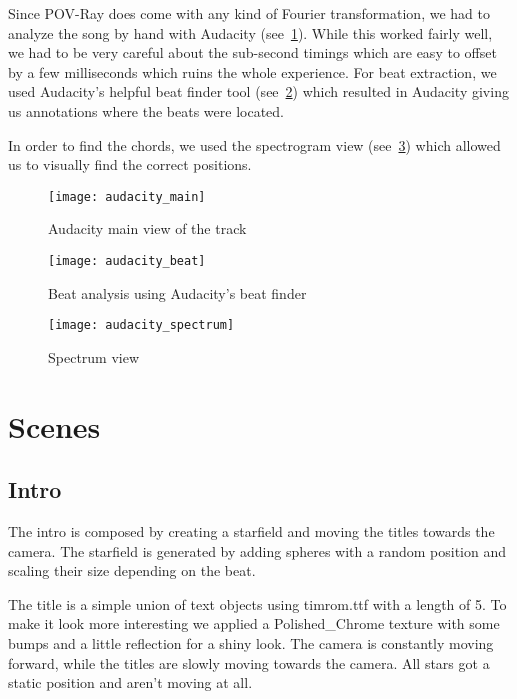 \documentclass[a4paper, 12pt]{scrartcl}
\begin{document}
    Since POV-Ray does come with any kind of Fourier transformation, we had to analyze the song by
    hand with Audacity (see~\ref{fig:main}). While this worked fairly well, we had to be very
    careful about the sub-second timings which are easy to offset by a few milliseconds which ruins
    the whole experience. For beat extraction, we used Audacity's helpful beat finder tool (see~\ref{fig:beat}) which resulted in Audacity giving us annotations where the beats were located.

    In order to find the chords, we used the spectrogram view (see~\ref{fig:spectrogram}) which
    allowed us to visually find the correct positions.

    \begin{figure}[H]
        \centering
        \texttt{[image: audacity\_main]}
        \caption{Audacity main view of the track}
        \label{fig:main}
    \end{figure}

    \begin{figure}[H]
        \centering
        \texttt{[image: audacity\_beat]}
        \caption{Beat analysis using Audacity's beat finder}
        \label{fig:beat}
    \end{figure}

    \begin{figure}[H]
        \centering
        \texttt{[image: audacity\_spectrum]}
        \caption{Spectrum view}
        \label{fig:spectrogram}
    \end{figure}

    \section{Scenes}
    \subsection{Intro}

    The intro is composed by creating a starfield and moving the titles towards the camera.
    The starfield is generated by adding spheres with a random position and scaling their size
    depending on the beat.

    The title is a simple union of text objects using timrom.ttf with a length of 5. To make
    it look more interesting we applied a Polished\_Chrome texture with some bumps and a little
    reflection for a shiny look. The camera is constantly moving forward, while the titles are
    slowly moving towards the camera. All stars got a static position and aren't moving at all.
\end{document}
